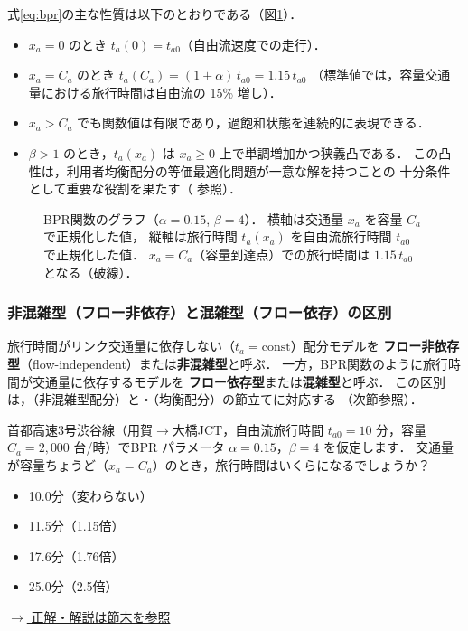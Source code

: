 式\eqref{eq:bpr}の主な性質は以下のとおりである（図\ref{fig:bpr-curve}）．

\begin{itemize}
  \item $x_a = 0$ のとき $t_a(0) = t_{a0}$（自由流速度での走行）．
  \item $x_a = C_a$ のとき $t_a(C_a) = (1+\alpha)\,t_{a0} = 1.15\,t_{a0}$
    （標準値では，容量交通量における旅行時間は自由流の 15\% 増し）．
  \item $x_a > C_a$ でも関数値は有限であり，過飽和状態を連続的に表現できる．
  \item $\beta > 1$ のとき，$t_a(x_a)$ は $x_a \geq 0$ 上で単調増加かつ狭義凸である．
    この凸性は，利用者均衡配分の等価最適化問題が一意な解を持つことの
    十分条件として重要な役割を果たす（ 参照）．
\end{itemize}

\begin{figure}[hbtp]
  \centering
  
  \caption{BPR関数のグラフ（$\alpha=0.15$, $\beta=4$）．
           横軸は交通量 $x_a$ を容量 $C_a$ で正規化した値，
           縦軸は旅行時間 $t_a(x_a)$ を自由流旅行時間 $t_{a0}$ で正規化した値．
           $x_a = C_a$（容量到達点）での旅行時間は $1.15\,t_{a0}$ となる（破線）．}
  \label{fig:bpr-curve}
\end{figure}

\subsubsection*{非混雑型（フロー非依存）と混雑型（フロー依存）の区別}

旅行時間がリンク交通量に依存しない（$t_a = \text{const}$）配分モデルを
\textbf{フロー非依存型}（flow-independent）または\textbf{非混雑型}と呼ぶ．
一方，BPR関数のように旅行時間が交通量に依存するモデルを
\textbf{フロー依存型}または\textbf{混雑型}と呼ぶ．
この区別は，（非混雑型配分）と・（均衡配分）の節立てに対応する
（次節参照）．

\begin{example}[title={クイズ 1：首都高3号線，朝ラッシュで何分遅れる？}]
首都高速3号渋谷線（用賀$\rightarrow$大橋JCT，自由流旅行時間 $t_{a0}=10$ 分，容量 $C_a=2{,}000$ 台/時）でBPR パラメータ $\alpha=0.15$，$\beta=4$ を仮定します．
交通量が容量ちょうど（$x_a = C_a$）のとき，旅行時間はいくらになるでしょうか？
\begin{itemize}
  \item[(ア)] 10.0分（変わらない）
  \item[(イ)] 11.5分（1.15倍）
  \item[(ウ)] 17.6分（1.76倍）
  \item[(エ)] 25.0分（2.5倍）
\end{itemize}
\hyperref[ans:q01]{$\rightarrow$ 正解・解説は節末を参照}
\end{example}

